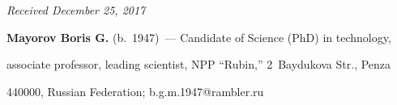 







\vspace*{-3pt}





\hfill{\small\textit{Received December 25, 2017}} 


       


       


       \Contrl


       


       \noindent


       \textbf{Mayorov Boris G.} (b.\ 1947)~--- Candidate of Science (PhD) in technology, 


associate professor, leading scientist, NPP ``Rubin,'' 2~Baydukova Str., Penza 


440000, Russian Federation;  \mbox{b.g.m.1947@rambler.ru}





\label{end\stat}








\renewcommand{\bibname}{\protect\rm Литература}


